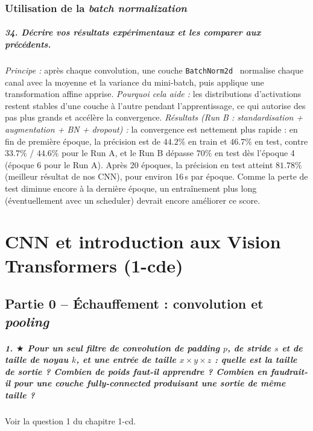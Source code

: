 \documentclass{report}
\begin{document}
\subsection{Utilisation de la \textit{batch normalization}}
\paragraph{34. Décrire vos résultats expérimentaux et les comparer aux précédents.}
 \textit{Principe :} après chaque convolution, une couche \texttt{BatchNorm2d}~\cite{ioffe2015} normalise chaque canal avec la moyenne et la variance du mini-batch, puis applique une transformation affine apprise. \textit{Pourquoi cela aide :} les distributions d'activations restent stables d'une couche à l'autre pendant l'apprentissage, ce qui autorise des pas plus grands et accélère la convergence. \textit{Résultats (Run B : standardisation + augmentation + BN + dropout) :} la convergence est nettement plus rapide : en fin de première époque, la précision est de $44.2\%$ en train et $46.7\%$ en test, contre $33.7\%$ / $44.6\%$ pour le Run A, et le Run B dépasse $70\%$ en test dès l'époque 4 (époque 6 pour le Run A). Après 20 époques, la précision en test atteint \textbf{$81.78\%$} (meilleur résultat de nos CNN), pour environ 16\,s par époque. Comme la perte de test diminue encore à la dernière époque, un entraînement plus long (éventuellement avec un scheduler) devrait encore améliorer ce score.

\chapter{CNN et introduction aux Vision Transformers (1-cde)}

\section{Partie 0 -- Échauffement : convolution et \textit{pooling}}

\paragraph{1. $\bigstar$ Pour un seul filtre de convolution de padding $p$, de stride $s$ et de taille de noyau $k$, et une entrée de taille $x \times y \times z$ : quelle est la taille de sortie ? Combien de poids faut-il apprendre ? Combien en faudrait-il pour une couche \textit{fully-connected} produisant une sortie de même taille ?}
Voir la question 1 du chapitre 1-cd.
\end{document}
